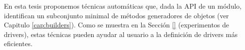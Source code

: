 En esta tesis proponemos técnicas automáticas que, dada la API de un módulo,
identifican un subconjunto minimal de métodos generadores de objetos (ver
Capitulo \ref{cap:builders}). Como se muestra en la Sección \ref{} (experimentos
de drivers), estas técnicas pueden ayudar al usuario a la 
definición de drivers más eficientes. 

